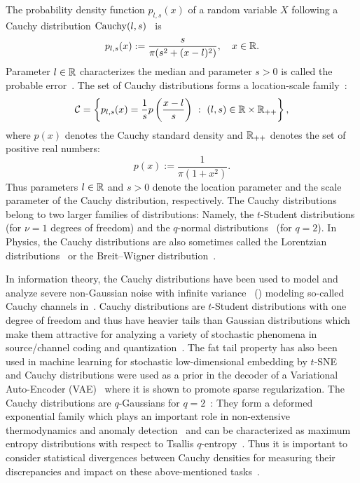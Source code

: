 \documentclass[journal]{IEEEtran}
\begin{document}
The probability density function $p_{l,s}(x)$ of a random variable $X$ following a Cauchy distribution $\mathrm{Cauchy}(l,s)$~\cite{mccullagh1992conditional} is
$$
p_{l,s}(x) := \frac{s}{\pi (s^2+(x-l)^2)},\quad x\in{\mathbb{R}}.
$$
Parameter $l\in{\mathbb{R}}$ characterizes the median and parameter $s>0$ is called the probable error~\cite{mccullagh1992conditional}.
The set of Cauchy distributions forms a location-scale family~\cite{KassVos-2011}: 
$$
\mathcal{C}=\left\{p_{l,s}(x)=\frac{1}{s} p\left(\frac{x-l}{s}\right) \ :\  (l,s)\in {\mathbb{R}}\times{\mathbb{R}}_{++}\right\},
$$ 
where $p(x)$ denotes the Cauchy standard density and ${\mathbb{R}}_{++}$ denotes  the set of positive real numbers:
\begin{equation}\label{eq:stdcauchy}
p(x):=\frac{1}{\pi(1+x^2)}.
\end{equation}
Thus parameters $l\in{\mathbb{R}}$ and $s>0$ denote the location parameter and the scale parameter of the Cauchy distribution, respectively. 
The Cauchy distributions belong to two larger families of distributions: 
Namely, the $t$-Student distributions (for $\nu=1$ degrees of freedom) and the $q$-normal distributions~\cite{naudts2011generalised} (for $q=2$).
In Physics, the Cauchy distributions are also sometimes called the Lorentzian distributions~\cite{filipovic2012two} or the Breit–Wigner distribution~\cite{vsirca2016special}. 


In information theory, the Cauchy distributions have been used to model and analyze severe non-Gaussian noise with infinite variance ~(\cite{miller1972detectors,sousa1992performance,merhav2011optimum})  modeling so-called Cauchy channels in~\cite{fahs2014cauchy,valero2017generalization}.
Cauchy distributions are $t$-Student distributions with one degree of freedom and thus have heavier tails than Gaussian distributions which make them attractive for analyzing a variety of stochastic phenomena in source/channel coding and quantization~\cite{farvardin1984optimum}.
The fat tail property has also been used in machine learning for stochastic low-dimensional embedding by $t$-SNE~\cite{tSNE-2008} and Cauchy distributions were used as a prior in the decoder of a Variational Auto-Encoder (VAE)~\cite{koike2022autovae} where it is shown to promote sparse regularization.
The Cauchy distributions are $q$-Gaussians for $q=2$~\cite{CauchyVoronoi-2020}: They form a deformed exponential family which plays an important role in non-extensive thermodynamics and anomaly detection~\cite{naudts2011generalised} and can be characterized as maximum entropy distributions with respect to Tsallis $q$-entropy~\cite{tsallis2009introduction}.
Thus it is important to consider statistical divergences between Cauchy densities for measuring their discrepancies and impact on these above-mentioned tasks~\cite{koike2022autovae}.
\end{document}
